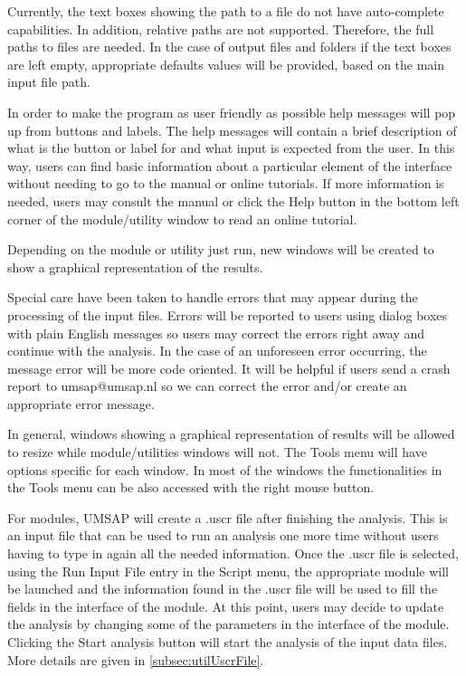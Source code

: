 Currently, the text boxes showing the path to a file  do not have auto-complete capabilities. In addition, relative paths are not supported. Therefore, the full paths to files are needed. In the case of output files and folders if the text boxes are left empty, appropriate defaults values will be provided, based on the main input file path.  

In order to make the program as user friendly as possible help messages will pop up from buttons and labels. The help messages will contain a brief description of what is the button or label for and what input is expected from the user. In this way, users can find basic information about a particular element of the interface without needing to go to the manual or online tutorials. If more information is needed, users may consult the manual or click the Help button in the bottom left corner of the module/utility window to read an online tutorial. 

Depending on the module or utility just run, new windows will be created to show a graphical representation of the results.

Special care have been taken to handle errors that may appear during the processing of the input files. Errors will be reported to users using dialog boxes with plain English messages so users may correct the errors right away and continue with the analysis. In the case of an unforeseen error occurring, the message error will be more code oriented. It will be helpful if users send a crash report to umsap@umsap.nl so we can correct the error and/or create an appropriate error message. 

In general, windows showing a graphical representation of results will be allowed to resize while module/utilities windows will not. The Tools menu will have options specific for each window. In most of the windows the functionalities in the Tools menu can be also accessed with the right mouse button.

For modules, UMSAP will create a .uscr\label{par:uscrFile} file after finishing the analysis. This is an input file that can be used to run an analysis one more time without users having to type in again all the needed information. Once the .uscr file is selected, using the Run Input File entry in the Script menu, the appropriate module will be launched and the information found in the .uscr file will be used to fill the fields in the interface of the module. At this point, users may decide to update the analysis by changing some of the parameters in the interface of the module. Clicking the Start analysis button will start the analysis of the input data files. More details are given in \autoref{subsec:utilUscrFile}.  


